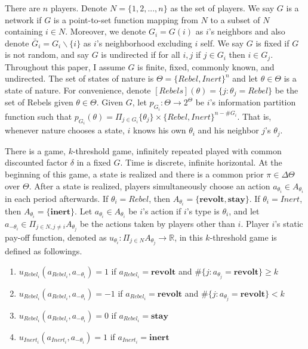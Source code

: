 \documentclass[12pt,letter]{article}
\theoremstyle{definition}
\theoremstyle{remark}
\theoremstyle{claim}
\begin{document}
There are $n$ players. Denote $N=\{1,2,...,n\}$ as the set of players.  We say $G$ is a network if $G$ is a point-to-set function mapping from $N$ to a subset of $N$ containing $i\in N$. Moreover, we denote $G_i=G(i)$ as $i$'s neighbors and also denote $\bar{G}_i=G_i\backslash \{i\}$ as $i$'s neighborhood excluding $i$ self. We say $G$ is fixed if $G$ is not random, and say $G$ is undirected if for all $i,j$ if $j\in G_i$ then $i\in G_j$. Throughout this paper, I assume $G$ is finite, fixed, commonly known, and undirected. The set of states of nature is $\Theta=\{Rebel,Inert\}^n$ and let $\theta\in \Theta$ is a state of nature. For convenience, denote $[Rebels](\theta)=\{j:\theta_j=Rebel\}$ be the set of Rebels given $\theta\in \Theta$. Given $G$, let $p_{G_i}:\Theta \rightarrow 2^{\Theta}$ be $i$'s information partition function such that $p_{G_i}(\theta)=\Pi_{j\in G_i}\{\theta_j\}\times \{Rebel,Inert\}^{n-\#G_{i}}$. That is, whenever nature chooses a state, $i$ knows his own $\theta_i$ and his neighbor $j$'s $\theta_j$. 

There is a game, $k$-threshold game, infinitely repeated played with common discounted factor $\delta$ in a fixed $G$. Time is discrete, infinite horizontal. At the beginning of this game, a state is realized and there is a common prior $\pi\in \Delta \Theta$ over $\Theta$. After a state is realized, players simultaneously choose an action $a_{\theta_i}\in A_{\theta_i}$ in each period afterwards. If $\theta_i=Rebel$, then $A_{\theta_i}=\{\textbf{revolt}, \textbf{stay}\}$.  If $\theta_i=Inert$, then $A_{\theta_i}=\{\textbf{inert}\}$. Let $a_{\theta_i}\in A_{\theta_i}$ be $i$'s action if $i$'s type is $\theta_i$, and let $a_{-\theta_i}\in \Pi_{j\in N,j\neq i}A_{\theta_j}$ be the actions taken by players other than $i$. Player $i$'s static pay-off function, denoted as $u_{\theta_i}: \Pi_{j\in N}A_{\theta_j}\rightarrow \mathbb{R}$, in this $k$-threshold game is defined as followings. 
\begin{enumerate}
\item $u_{Rebel_i}(a_{Rebel_i},a_{-\theta_i})=1$ if $a_{Rebel_i}=\textbf{revolt}$ and $\#\{j:a_{\theta_j}=\textbf{revolt}\}\geq k$
\item $u_{Rebel_i}(a_{Rebel_i},a_{-\theta_i})=-1$ if $a_{Rebel_i}=\textbf{revolt}$ and $\#\{j:a_{\theta_j}=\textbf{revolt}\}< k$
\item $u_{Rebel_i}(a_{Rebel_i},a_{-\theta_i})=0$ if $a_{Rebel_i}=\textbf{stay}$
\item $u_{Inert_i}(a_{Inert_i},a_{-\theta_i})=1$ if $a_{Inert_i}=\textbf{inert}$
\end{enumerate}
\end{document}
